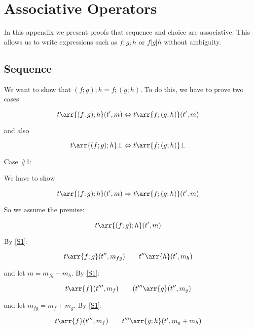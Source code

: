 
\section{Associative Operators}

In this appendix we present proofs that sequence and choice are
associative. This allows us to write expressions such as $f;g;h$
or $f|g|h$ without ambiguity.

\subsection{Sequence}
\label{sec:seq-assoc}

We want to show that $(f;g);h = f;(g;h)$. To do this, we have to
prove two cases:

\begin{equation}
t \arr{(f;g);h} (t',m) \Leftrightarrow t \arr{f;(g;h)} (t',m)
\end{equation}

and also

\begin{equation}
t \arr{(f;g);h} \bot \Leftrightarrow t \arr{f;(g;h)} \bot
\end{equation}

Case \#1:

We have to show

\begin{equation}
t \arr{(f;g);h} (t',m) \Rightarrow t \arr{f;(g;h)} (t',m)
\end{equation}

So we assume the premise:

\begin{equation}
t \arr{(f;g);h} (t',m)
\end{equation}

By \eqref{S1}:

\begin{equation}
t \arr{f;g} (t'',m_{fg}) \qquad t'' \arr{h} (t',m_h)
\end{equation}

and let $m = m_{fg}+m_h$. By \eqref{S1}:

\begin{equation}
t \arr{f} (t''',m_f) \qquad (t''' \arr{g} (t'',m_g)
\end{equation}

and let $m_{fg} = m_f+m_g$. By \eqref{S1}:

\begin{equation}
t \arr{f} (t''',m_f) \qquad t''' \arr{g;h} (t',m_g+m_h)
\end{equation}

